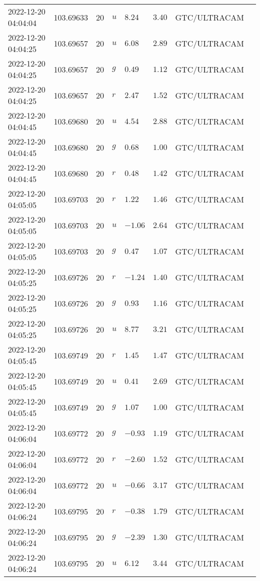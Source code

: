 \documentclass{nature_plusfigure}
\begin{document}
\begin{supplement}
\begin{center}
\begin{longtable}{llllllll}
2022-12-20 04:04:04 & 103.69633 & 20 & $u$ & $8.24$ & $3.40$ & GTC/ULTRACAM &  \\ 
2022-12-20 04:04:25 & 103.69657 & 20 & $u$ & $6.08$ & $2.89$ & GTC/ULTRACAM &  \\ 
2022-12-20 04:04:25 & 103.69657 & 20 & $g$ & $0.49$ & $1.12$ & GTC/ULTRACAM &  \\ 
2022-12-20 04:04:25 & 103.69657 & 20 & $r$ & $2.47$ & $1.52$ & GTC/ULTRACAM &  \\ 
2022-12-20 04:04:45 & 103.69680 & 20 & $u$ & $4.54$ & $2.88$ & GTC/ULTRACAM &  \\ 
2022-12-20 04:04:45 & 103.69680 & 20 & $g$ & $0.68$ & $1.00$ & GTC/ULTRACAM &  \\ 
2022-12-20 04:04:45 & 103.69680 & 20 & $r$ & $0.48$ & $1.42$ & GTC/ULTRACAM &  \\ 
2022-12-20 04:05:05 & 103.69703 & 20 & $r$ & $1.22$ & $1.46$ & GTC/ULTRACAM &  \\ 
2022-12-20 04:05:05 & 103.69703 & 20 & $u$ & $-1.06$ & $2.64$ & GTC/ULTRACAM &  \\ 
2022-12-20 04:05:05 & 103.69703 & 20 & $g$ & $0.47$ & $1.07$ & GTC/ULTRACAM &  \\ 
2022-12-20 04:05:25 & 103.69726 & 20 & $r$ & $-1.24$ & $1.40$ & GTC/ULTRACAM &  \\ 
2022-12-20 04:05:25 & 103.69726 & 20 & $g$ & $0.93$ & $1.16$ & GTC/ULTRACAM &  \\ 
2022-12-20 04:05:25 & 103.69726 & 20 & $u$ & $8.77$ & $3.21$ & GTC/ULTRACAM &  \\ 
2022-12-20 04:05:45 & 103.69749 & 20 & $r$ & $1.45$ & $1.47$ & GTC/ULTRACAM &  \\ 
2022-12-20 04:05:45 & 103.69749 & 20 & $u$ & $0.41$ & $2.69$ & GTC/ULTRACAM &  \\ 
2022-12-20 04:05:45 & 103.69749 & 20 & $g$ & $1.07$ & $1.00$ & GTC/ULTRACAM &  \\ 
2022-12-20 04:06:04 & 103.69772 & 20 & $g$ & $-0.93$ & $1.19$ & GTC/ULTRACAM &  \\ 
2022-12-20 04:06:04 & 103.69772 & 20 & $r$ & $-2.60$ & $1.52$ & GTC/ULTRACAM &  \\ 
2022-12-20 04:06:04 & 103.69772 & 20 & $u$ & $-0.66$ & $3.17$ & GTC/ULTRACAM &  \\ 
2022-12-20 04:06:24 & 103.69795 & 20 & $r$ & $-0.38$ & $1.79$ & GTC/ULTRACAM &  \\ 
2022-12-20 04:06:24 & 103.69795 & 20 & $g$ & $-2.39$ & $1.30$ & GTC/ULTRACAM &  \\ 
2022-12-20 04:06:24 & 103.69795 & 20 & $u$ & $6.12$ & $3.44$ & GTC/ULTRACAM &  \\ 

\end{longtable}
\end{center}
\end{supplement}
\end{document}
